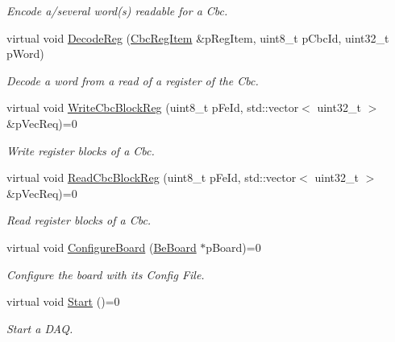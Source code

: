 \begin{CompactItemize}
\begin{CompactList}\small\item\em Encode a/several word(s) readable for a Cbc. \item\end{CompactList}\item 
virtual void \hyperlink{class_ph2___hw_interface_1_1_be_board_f_w_interface_d0bd156b59bcc266949b08ed87a35a00}{Decode\-Reg} (\hyperlink{struct_ph2___hw_description_1_1_cbc_reg_item}{Cbc\-Reg\-Item} \&p\-Reg\-Item, uint8\_\-t p\-Cbc\-Id, uint32\_\-t p\-Word)
\begin{CompactList}\small\item\em Decode a word from a read of a register of the Cbc. \item\end{CompactList}\item 
virtual void \hyperlink{class_ph2___hw_interface_1_1_be_board_f_w_interface_9cc424d15f9f0fc310279377c2916654}{Write\-Cbc\-Block\-Reg} (uint8\_\-t p\-Fe\-Id, std::vector$<$ uint32\_\-t $>$ \&p\-Vec\-Req)=0
\begin{CompactList}\small\item\em Write register blocks of a Cbc. \item\end{CompactList}\item 
virtual void \hyperlink{class_ph2___hw_interface_1_1_be_board_f_w_interface_c88ca7560104bf438fb1e57f1ce089f1}{Read\-Cbc\-Block\-Reg} (uint8\_\-t p\-Fe\-Id, std::vector$<$ uint32\_\-t $>$ \&p\-Vec\-Req)=0
\begin{CompactList}\small\item\em Read register blocks of a Cbc. \item\end{CompactList}\item 
virtual void \hyperlink{class_ph2___hw_interface_1_1_be_board_f_w_interface_b8836074e2dc8f3afb211479119390fc}{Configure\-Board} (\hyperlink{class_ph2___hw_description_1_1_be_board}{Be\-Board} $\ast$p\-Board)=0
\begin{CompactList}\small\item\em Configure the board with its Config File. \item\end{CompactList}\item 
virtual void \hyperlink{class_ph2___hw_interface_1_1_be_board_f_w_interface_03bccd64fb4656dc0f9735618860ca35}{Start} ()=0
\begin{CompactList}\small\item\em Start a DAQ. \item\end{CompactList}\item 

\end{CompactItemize}
